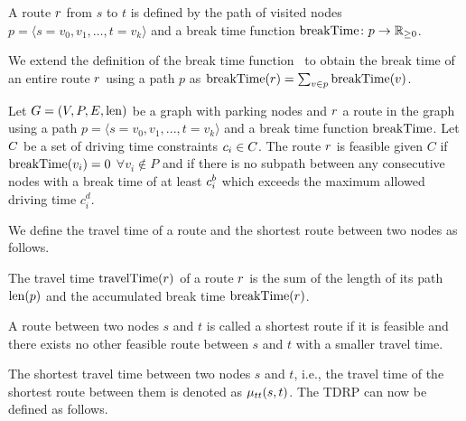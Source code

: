 \begin{definition}[Route]
	A route $r$ from $s$ to $t$ is defined by the path of visited nodes $p = \langle s=v_0,v_1,\dots,t=v_k \rangle$ and a break time function $\operatorname{breakTime}\colon p \rightarrow \mathbb{R}_{\ge 0}$.
\end{definition}

We extend the definition of the break time function \breakTime\ to obtain the break time of an entire route $r$ using a path $p$ as $\operatorname{breakTime}(r) = \sum_{v \in p}{\operatorname{breakTime}(v)}$.

\begin{samepage}
	\begin{definition}
		Let $G=(V,P,E,\operatorname{len})$ be a graph with parking nodes and $r$ a route in the graph using a path $p = \langle s=v_0,v_1,...,t=v_k \rangle$ and a break time function $\operatorname{breakTime}$. Let $C$ be a set of driving time constraints $c_i \in C$. The route $r$ is feasible given $C$ if $\operatorname{breakTime}(v_i) = 0$ $\forall v_i \notin P$ and if there is no subpath between any consecutive nodes with a break time of at least $c_i^b$ which exceeds the maximum allowed driving time $c_i^d$.
	\end{definition}
\end{samepage}

We define the travel time of a route and the shortest route between two nodes as follows.

\begin{definition}
	The travel time $\operatorname{travelTime}(r)$ of a route $r$ is the sum of the length of its path $\operatorname{len}(p)$ and the accumulated break time $\operatorname{breakTime}(r)$.
\end{definition}

\begin{definition}
	A route between two nodes $s$ and $t$ is called a shortest route if it is feasible and there exists no other feasible route between $s$ and $t$ with a smaller travel time.
\end{definition}

The shortest travel time between two nodes $s$ and $t$, i.e., the travel time of the shortest route between them is denoted as $\mu_{tt}(s,t)$. The TDRP can now be defined as follows.

\begin{namedproblem}
\end{namedproblem}

